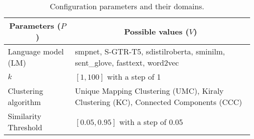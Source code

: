 \begin{table}[t]
    \centering
    \caption{Configuration parameters and their domains.}
    \label{tab:parameter-values}
    \begin{tabular}{|p{3cm}|p{4.5cm}|}
        \hline
         \multicolumn{1}{|c|}{\textbf{Parameters ($P$)}} & \multicolumn{1}{|c|}{\textbf{Possible values ($V$)}} \\ \hline
        Language model (LM) & smpnet, S-GTR-T5, sdistilroberta, sminilm, sent\_glove, fasttext, word2vec \\ \hline
        $k$ & $[1, 100]$ with a step of 1\\ \hline
        Clustering algorithm & Unique Mapping Clustering (UMC), Kiraly Clustering (KC), Connected Components (CCC) \\ \hline
        Similarity Threshold & $[0.05, 0.95]$ with a step of 0.05\\ \hline
    \end{tabular}
\end{table}